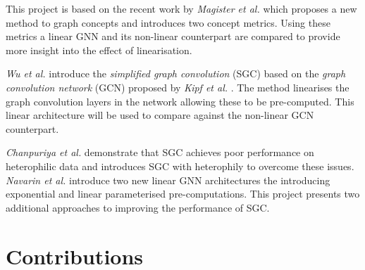 




This project is based on the recent work by \textit{Magister et al.} \cite{magister2021gcexplainer} which proposes a new method to graph concepts and introduces two concept metrics.
Using these metrics a linear GNN and its non-linear counterpart are compared to provide more insight into the effect of linearisation.




\textit{Wu et al.} \cite{wu2019simplifying} introduce the \emph{simplified graph convolution} (SGC) based on the \emph{graph convolution network} (GCN) proposed by \textit{Kipf et al.} \cite{kipf2016semi}.
The method linearises the graph convolution layers in the network allowing these to be pre-computed.
This linear architecture will be used to compare against the non-linear GCN counterpart.




\textit{Chanpuriya et al.} \cite{chanpuriya2022simplified} demonstrate that SGC achieves poor performance on heterophilic data and introduces SGC with heterophily to overcome these issues.
\textit{Navarin et al.} \cite{navarin2020linear} introduce two new linear GNN architectures the introducing exponential and linear parameterised pre-computations.
This project presents two additional approaches to improving the performance of SGC.


\section{Contributions}



